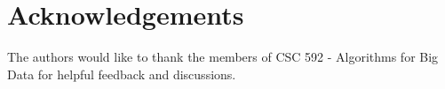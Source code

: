 \section{Acknowledgements}
\label{sec:acknowledgements}

The authors would like to thank the members of CSC 592 - Algorithms for Big Data for helpful feedback and discussions.
